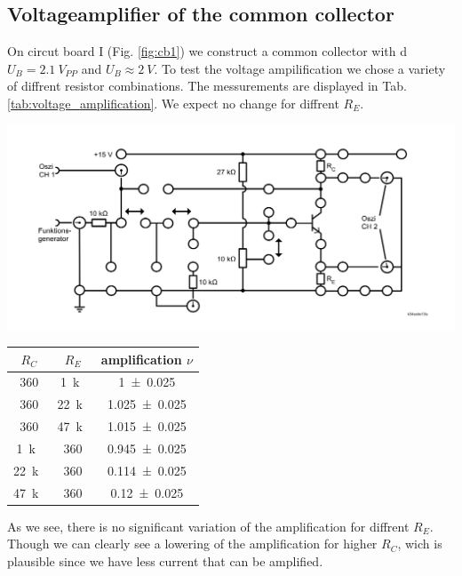 \documentclass[a4paper,10pt]{article}
\newenvironment{Figure}
  {\par\medskip\noindent\minipage{\linewidth}}
  {\endminipage\par\medskip} %
\numberwithin{equation}{section}
\begin{document}
\begin{multicols}{2}
	\subsection{Voltageamplifier of the common collector}
	On circut board I (Fig. \ref{fig:cb1}) we construct a common collector with d$U_B=\SI{2.1}{V_{PP}}$ and $U_B\approx \SI{2}{V}$. To test the voltage ampilification we chose a variety of diffrent resistor combinations. The messurements are displayed in Tab. \ref{tab:voltage_amplification}. We expect no change for diffrent $R_E$.
	\begin{Figure}
		\centering
		\includegraphics[width=1\textwidth]{circut_board_1.png}
		\label{fig:cb1}
	\end{Figure}
	\begin{center}
		\begin{tabular}{|c|c|c|}
			\hline
			$R_C$            & $R_E$            & amplification $\nu$ \\
			\hline
			\SI{360}{\Omega} & \SI{1}{k\Omega}  & \SI{1+-0.025}{}     \\
			\SI{360}{\Omega} & \SI{22}{k\Omega} & \SI{1.025+-0.025}{} \\
			\SI{360}{\Omega} & \SI{47}{k\Omega} & \SI{1.015+-0.025}{} \\
			\hline
			\SI{1}{k\Omega}  & \SI{360}{\Omega} & \SI{0.945+-0.025}{} \\
			\SI{22}{k\Omega} & \SI{360}{\Omega} & \SI{0.114+-0.025}{} \\
			\SI{47}{k\Omega} & \SI{360}{\Omega} & \SI{0.12+-0.025}{}  \\
			\hline
		\end{tabular}
		\label{tab:voltage_amplification}
	\end{center}
	As we see, there is no significant variation of the amplification for diffrent $R_E$. Though we can clearly see a lowering of the amplification for higher $R_C$, wich is plausible since we have less current that can be amplified.



\end{multicols}
\end{document}
